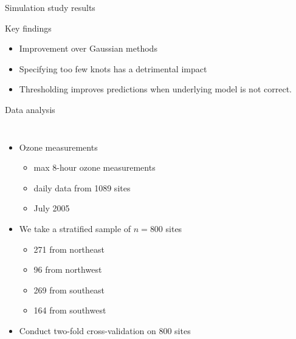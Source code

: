 \documentclass{beamer}
\begin{document}
\begin{frame}{Simulation study results}
\begin{adjustwidth}{1em}{0em}
  Key findings \vspace{1em}
  \begin{itemize} \setlength{\itemsep}{1em}
    \item Improvement over Gaussian methods
    \item Specifying too few knots has a detrimental impact
    \item Thresholding improves predictions when underlying model is not correct.
  \end{itemize}
\end{adjustwidth}
\end{frame}

\begin{frame}{Data analysis}
\begin{columns}[c]
	\begin{itemize} \setlength{\itemsep}{1em}
	\item Ozone measurements
	\begin{itemize}
		\item max 8-hour ozone measurements
		\item daily data from 1089 sites
		\item July 2005
	\end{itemize}
  \item We take a stratified sample of $n = 800$ sites
  \begin{itemize}
    \item 271 from northeast
    \item 96 from northwest
    \item 269 from southeast
    \item 164 from southwest
  \end{itemize}
  \item Conduct two-fold cross-validation on 800 sites
	\end{itemize}


\end{columns}
\end{frame}
\end{document}
